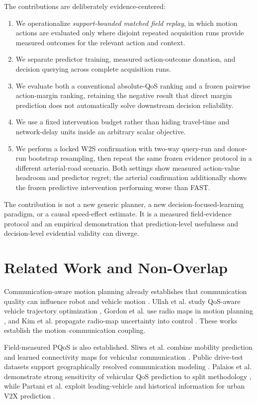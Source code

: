\documentclass[journal]{IEEEtran}
\begin{document}
The contributions are deliberately evidence-centered:
\begin{enumerate}
\item We operationalize \emph{support-bounded matched field replay}, in which motion actions are evaluated only where disjoint repeated acquisition runs provide measured outcomes for the relevant action and context.
\item We separate predictor training, measured action-outcome donation, and decision querying across complete acquisition runs.
\item We evaluate both a conventional absolute-QoS ranking and a frozen pairwise action-margin ranking, retaining the negative result that direct margin prediction does not automatically solve downstream decision reliability.
\item We use a fixed intervention budget rather than hiding travel-time and network-delay units inside an arbitrary scalar objective.
\item We perform a locked W2S confirmation with two-way query-run and donor-run bootstrap resampling, then repeat the same frozen evidence protocol in a different arterial-road scenario. Both settings show measured action-value headroom and predictor regret; the arterial confirmation additionally shows the frozen predictive intervention performing worse than FAST.
\end{enumerate}

The contribution is not a new generic planner, a new decision-focused-learning paradigm, or a causal speed-effect estimate. It is a measured field-evidence protocol and an empirical demonstration that prediction-level usefulness and decision-level evidential validity can diverge.

\section{Related Work and Non-Overlap}
Communication-aware motion planning already establishes that communication quality can influence robot and vehicle motion \cite{ghaffarkhah2011,muralidharan2021,hurst2021,cai2022}. Ullah et al. study QoS-aware vehicle trajectory optimization \cite{ullah2025}, Gordon et al. use radio maps in motion planning \cite{gordon2026}, and Kim et al. propagate radio-map uncertainty into control \cite{kim2026}. These works establish the motion--communication coupling.

Field-measured PQoS is also established. Sliwa et al. combine mobility prediction and learned connectivity maps for vehicular communication \cite{sliwa2018}. Public drive-test datasets support geographically resolved communication modeling \cite{hernangomez2023,zhang2026}. Palaios et al. demonstrate strong sensitivity of vehicular QoS prediction to split methodology \cite{palaios2023}, while Partani et al. exploit leading-vehicle and historical information for urban V2X prediction \cite{partani2025}.
\end{document}
